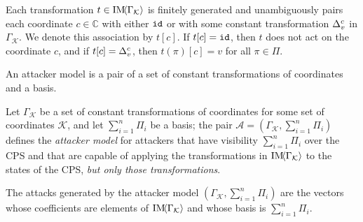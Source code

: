 {\begin{definition}
Each transformation $t\in \text{IM}\!{{\left<\Gamma_{\mathcal{K}}\right>}}$ is finitely generated and unambiguously pairs each coordinate $c\in \mathbb{C}$ with either ${\texttt{id}}$ or with some constant transformation ${\Delta}^{c}_{v}$ in $\Gamma_{\mathcal{K}}$.  We denote this association by $t[c]$. If $t[c]={\texttt{id}}$, then $t$ does not act on the coordinate $c$, and if $t[c]={\Delta}^{c}_{v}$, then $t(\pi)[c]=v$ for all $\pi \in \Pi$.
\end{definition}
An attacker model is a pair of a set of constant transformations of coordinates and a basis.
\begin{definition}
  Let $\Gamma_\mathcal{K}$ be a set of constant transformations of coordinates for some set of coordinates $\mathcal{K}$, and let $\sum_{i=1}^n\Pi_i$ be a basis; the pair $\mathcal{A}=(\Gamma_{\mathcal{K}}, \sum_{i=1}^n\Pi_i)$ defines the \emph{attacker model} for attackers that have visibility $\sum_{i=1}^n\Pi_i$ over the CPS and that are capable of applying the transformations in $\text{IM}\!{{\left<\Gamma_\mathcal{K}\right>}}$ %
   to the states of the CPS, \emph{but only those transformations}. %
   
   The attacks generated by the attacker model $(\Gamma_{\mathcal{K}}, \sum_{i=1}^n\Pi_i)$ are the vectors whose coefficients are elements of $\text{IM}\!{{\left<\Gamma_\mathcal{K}\right>}}$ and whose basis is $\sum_{i=1}^n\Pi_i$. 
 \end{definition}
 
}
